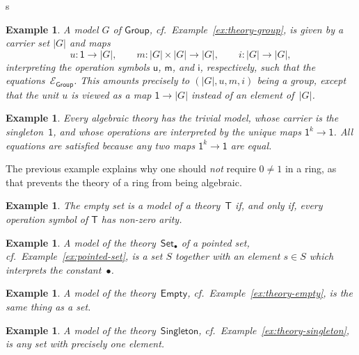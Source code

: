s\documentclass{amsart}
\newcommand{\theory}[1]{\mathsf{#1}} %
\newcommand{\equations}[1]{\mathcal{E}_{\theory{#1}}} %
\newcommand{\carrier}[1]{|#1|} %
\newcommand{\one}{\mathsf{1}} %
\newtheorem{example}[definition]{Example}
\begin{document}
\begin{example}
  A model $G$ of $\theory{Group}$, cf.\ Example~\ref{ex:theory-group}, is given by a
  carrier set $\carrier{G}$ and maps
  \begin{equation*}
    u : \one \to \carrier{G},\qquad
    m : \carrier{G} \times \carrier{G} \to \carrier{G},\qquad
    i : \carrier{G} \to \carrier{G},
  \end{equation*}
  interpreting the operation symbols $\mathsf{u}$, $\mathsf{m}$, and $\mathsf{i}$,
  respectively, such that the equations~$\equations{Group}$. This amounts precisely to
  $(\carrier{G}, u, m, i)$ being a group, except that the unit $u$ is viewed as a map
  $\one \to \carrier{G}$ instead of an element of~$\carrier{G}$.
\end{example}

\begin{example}
  Every algebraic theory has the \emph{trivial model}, whose carrier is the
  singleton~$\one$, and whose operations are interpreted by the unique maps
  $\one^k \to \one$. All equations are satisfied because any two maps $\one^k \to \one$
  are equal.
\end{example}

The previous example explains why one should \emph{not} require $0 \neq 1$ in a ring, as
that prevents the theory of a ring from being algebraic.

\begin{example}
  The empty set is a model of a theory~$\theory{T}$ if, and only if, every operation symbol
  of $\theory{T}$ has non-zero arity.
\end{example}

\begin{example}
  A model of the theory~$\theory{Set_\bullet}$ of a pointed set, cf.\
  Example~\ref{ex:pointed-set}, is a set $S$ together with an element $s \in S$ which
  interprets the constant~$\bullet$.
\end{example}

\begin{example}
  A model of the theory~$\theory{Empty}$, cf.\ Example~\ref{ex:theory-empty}, is the same
  thing as a set.
\end{example}

\begin{example}
  A model of the theory~$\theory{Singleton}$, cf.\ Example~\ref{ex:theory-singleton}, is
  any set with precisely one element.
\end{example}
\end{document}

